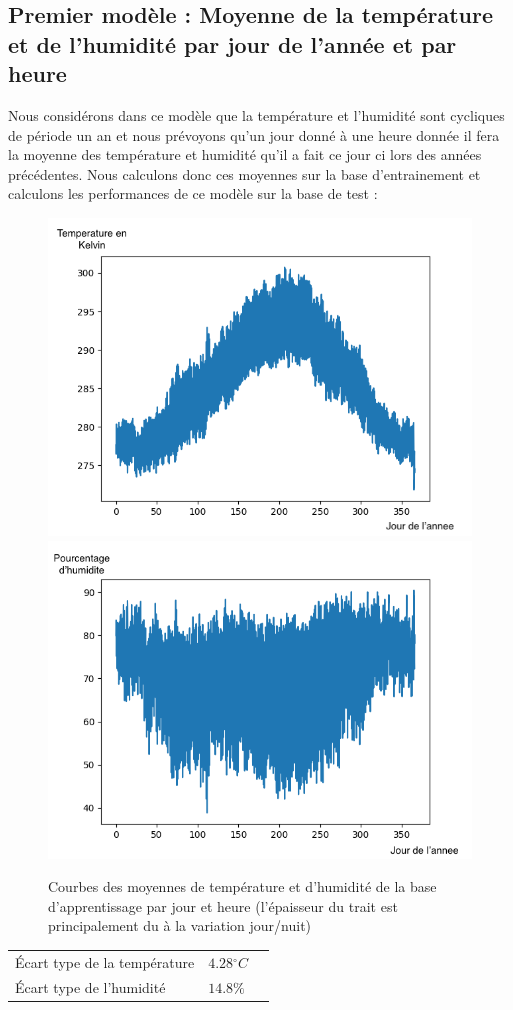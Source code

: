 \documentclass[11pt,a4paper]{article}
\begin{document}

\subsection{Premier modèle : Moyenne de la température et de l'humidité par jour de l'année et par heure }
Nous considérons dans ce modèle que la température et l'humidité sont cycliques de période un an et nous prévoyons qu'un jour donné à une heure donnée il fera la moyenne des température et humidité qu'il a fait ce jour ci lors des années précédentes.
Nous calculons donc ces moyennes sur la base d'entrainement et calculons les performances de ce modèle sur la base de test : \\

\begin{figure} [!h]
\centering
\includegraphics[width=0.48 \textwidth]{./imagesTIPE/moyenneT.png}\quad
\includegraphics[width=0.48 \textwidth]{./imagesTIPE/moyenneH.png}
\caption{\label{fig:xxx} Courbes des moyennes de température et d'humidité de la base d'apprentissage par jour et heure (l'épaisseur du trait est principalement du à la variation jour/nuit)}
\end{figure}

\begin{tabular}{lll}\hline
\hline
Écart type de la température& $4.28{}^{\circ}C$\\
Écart type de l'humidité       &  $ 14.8\% $\\
\hline 
\end{tabular}
\end{document}
